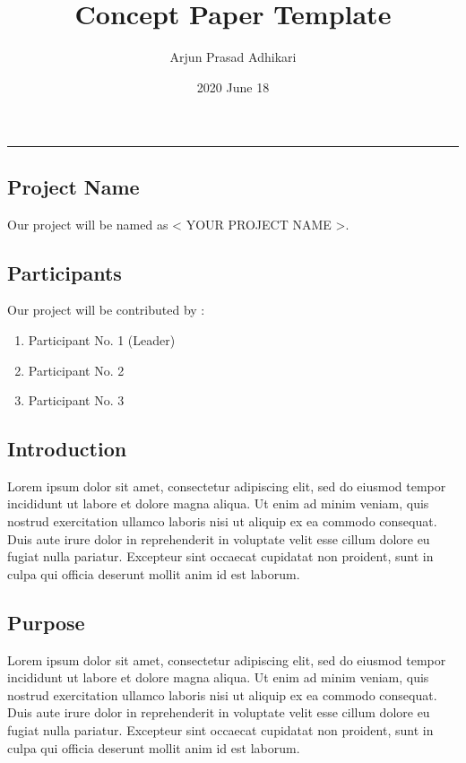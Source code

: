 \documentclass[a4paper, 12pt]{report}
\title{Concept Paper Template}
\author{Arjun Prasad Adhikari}
\date{2020 June 18}
\begin{document}
	\chapter*{}
	\hrule
	\vspace{2cm}
	
	
	\section*{Project Name}
	Our project will be named as < YOUR PROJECT NAME >.
	\vspace{1cm}
	
	\section*{Participants}
	Our project will be contributed by :
	\begin{enumerate}
		\item Participant No. 1 (Leader)
		\item Participant No. 2
		\item Participant No. 3
	\end{enumerate}
	\vspace{1cm}


	\section*{Introduction}
	Lorem ipsum dolor sit amet, consectetur adipiscing elit, sed do eiusmod tempor incididunt ut labore et dolore magna aliqua. Ut enim ad minim veniam, quis nostrud exercitation ullamco laboris nisi ut aliquip ex ea commodo consequat. Duis aute irure dolor in reprehenderit in voluptate velit esse cillum dolore eu fugiat nulla pariatur. Excepteur sint occaecat cupidatat non proident, sunt in culpa qui officia deserunt mollit anim id est laborum.
	\vspace{1cm}
	
	
	\section*{Purpose}
	Lorem ipsum dolor sit amet, consectetur adipiscing elit, sed do eiusmod tempor incididunt ut labore et dolore magna aliqua. Ut enim ad minim veniam, quis nostrud exercitation ullamco laboris nisi ut aliquip ex ea commodo consequat. Duis aute irure dolor in reprehenderit in voluptate velit esse cillum dolore eu fugiat nulla pariatur. Excepteur sint occaecat cupidatat non proident, sunt in culpa qui officia deserunt mollit anim id est laborum.
	\vspace{1cm}
	
\end{document}
